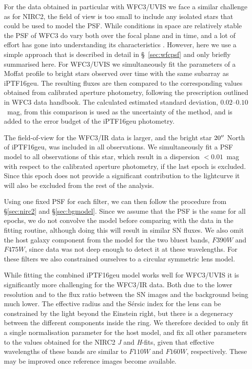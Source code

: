 \documentclass[a4paper,fleqn,usenatbib]{mnras}
\newcommand{\geu}{iPTF16geu\xspace}
\newcommand{\sn}{SN\xspace}
\newcommand{\wfc}{WFC3\xspace}
\newcommand{\wfcuvis}{WFC3/UVIS\xspace}
\newcommand{\wfcir}{WFC3/IR\xspace}
\newcommand{\jband}{{\it J}\xspace}
\newcommand{\hband}{{\it H}\xspace}
\newcommand{\hstu}{$F390W$\xspace}
\newcommand{\hstb}{$F475W$\xspace}
\newcommand{\hstj}{$F110W$\xspace}
\newcommand{\hsth}{$F160W$\xspace}
\begin{document}
For the data obtained in particular with \wfcuvis we face a similar challenge as for NIRC2, the field of view is too small to
include any isolated stars that could be used to model the PSF.  While conditions in space are relatively stable the PSF 
of \wfc do vary both over the focal plane and in time, and a lot of effort has gone into understanding its characteristics 
\citep{2016wfc..rept...12A,2017arXiv170600386A}.  However, here we use a simple approach that is described in detail 
in \S~\ref{sec:wfcpsf} and only briefly summarised here.  For \wfcuvis we simultaneously fit the parameters of a Moffat profile 
to bright stars observed over time with the same subarray as \geu. The resulting fluxes are then compared to the corresponding 
values obtained from calibrated aperture photometry, following the prescription outlined in \wfc data handbook.  The calculated 
estimated standard deviation, $0.02$--$0.10$~mag, from this comparison is used as the uncertainty of the method, and is 
added to the error budget of the \geu photometry.

The field-of-view for the \wfcir data is larger, and the bright star $20\hbox{$^{\prime\prime}$}$ North of \geu, was included in all observations.
We simultaneously fit a PSF model to all observations of this star, which result in a dispersion $<0.01$~mag with 
respect to the calibrated aperture photometry, if the last epoch is excluded.  Since this epoch does not provide a significant 
contribution to the lightcurve it will also be excluded from the rest of the analysis.

Using one fixed PSF for each filter, we can then follow the procedure from \S\ref{sec:nirc2} and \S\ref{sec:bgmodel}.  Since 
we assume that the PSF is the same for all epochs, we do not convolve the model before comparing with the data in the 
fitting routine, although doing this will result in similar \sn fluxes.  We also omit the host galaxy component from the model for 
the two bluest bands, \hstu and \hstb, since data was not deep enough to detect it at these wavelengths.  For these filters we also 
constrained ourselves to a circular symmetric lens model.

While fitting the combined \geu model works well for \wfcuvis it is significantly more challenging for the \wfcir data.  Both due to the
lower resolution and to the flux ratio between the \sn images and the background being much lower.   The effective radius and the
S\'ersic index for the lens can be constrained by the light beyond the Einstein right, but there is a degeneracy between the different 
components inside the ring.  We therefore decided to only fit a single normalisation parameter for the host model, and fix all other 
parameters to the values obtained for the NIRC2 \jband and \hband-fits, given that effective wavelengths of these bands are similar 
to \hstj and \hsth, respectively.  These may be improved once reference images become available.
\end{document}
